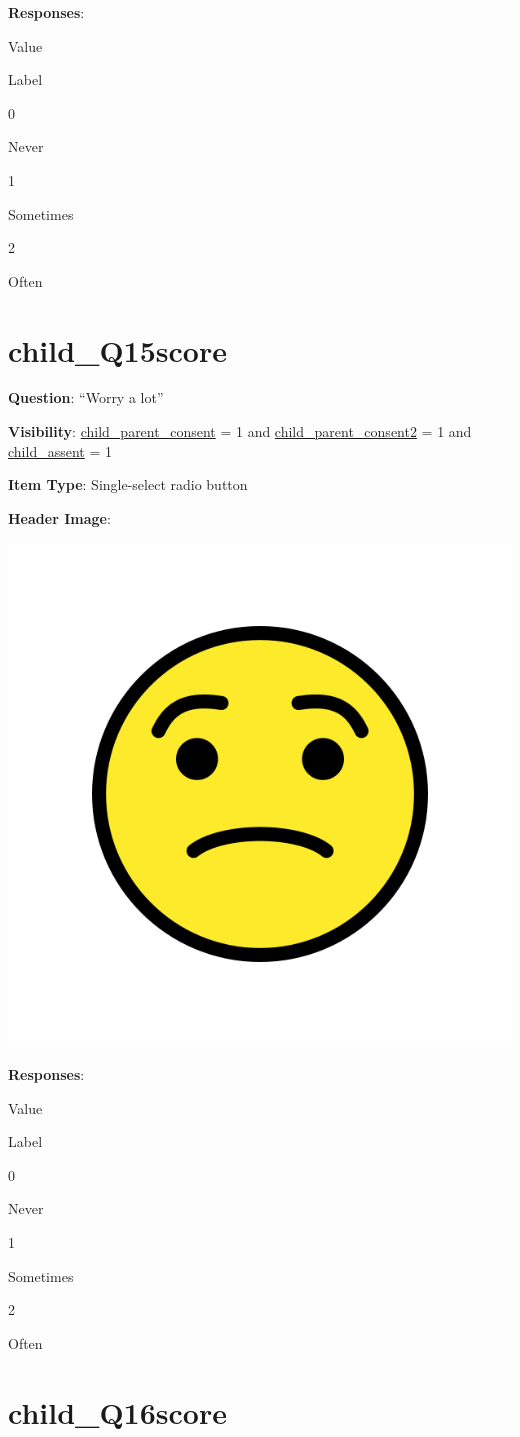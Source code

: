 \documentclass[]{book}
\begin{document}
\textbf{Responses}:

Value

Label

0

Never

1

Sometimes

2

Often

\hypertarget{child_q15score}{%
\section{child\_Q15score}\label{child_q15score}}

\textbf{Question}: ``Worry a lot''

\textbf{Visibility}: \protect\hyperlink{child_parent_consent}{child\_parent\_consent} = 1 and \protect\hyperlink{child_parent_consent2}{child\_parent\_consent2} = 1 and \protect\hyperlink{child_assent}{child\_assent} = 1

\textbf{Item Type}: Single-select radio button

\textbf{Header Image}:

\begin{flushleft}\includegraphics[width=0.33\linewidth]{downloadFigs4latex_HBN_PMHS_Codebook/child_Q15score_headerImg} \end{flushleft}

\textbf{Responses}:

Value

Label

0

Never

1

Sometimes

2

Often

\hypertarget{child_q16score}{%
\section{child\_Q16score}\label{child_q16score}}
\end{document}
